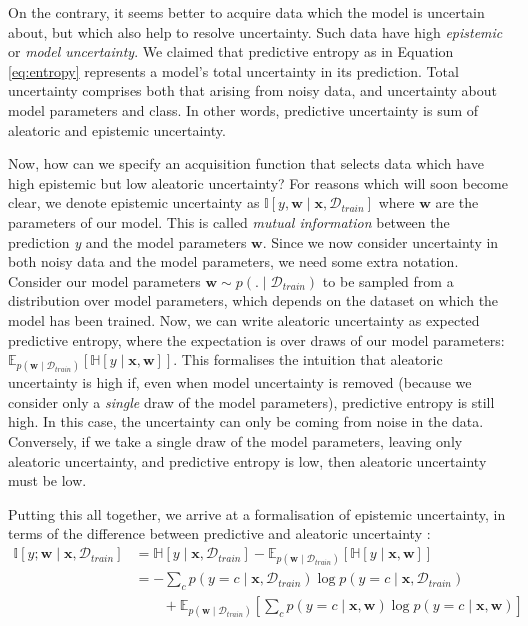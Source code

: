 \documentclass[11pt, a4paper, bibliography=totoc]{report}
\newcommand{\E}[2]{\mathbb{E}_{#1} \left[ #2 \right] }
\newcommand{\data}{\mathcal{D}}
\newcommand{\entropy}[1]{\mathbb{H} \left[ #1 \right] }
\newcommand{\MI}[1]{\mathbb{I} \left[ #1 \right] }
\newcommand{\w}{\mathbf{w}}
\newcommand{\x}{\mathbf{x}}
\begin{document}
On the contrary, it seems better to acquire data which the model is uncertain about, but which also help to resolve uncertainty. Such data have high \textit{epistemic} or \textit{model uncertainty}. We claimed that predictive entropy as in Equation \ref{eq:entropy} represents a model's total uncertainty in its prediction. Total uncertainty comprises both that arising from noisy data, and uncertainty about model parameters and class. In other words, predictive uncertainty is sum of aleatoric and epistemic uncertainty.

Now, how can we specify an acquisition function that selects data which have high epistemic but low aleatoric uncertainty? For reasons which will soon become clear, we denote epistemic uncertainty as $ \MI{y, \w \mid \x, \data_{train}} $ where $ \w $ are the parameters of our model. This is called \textit{mutual information} between the prediction \textit{y} and the model parameters $ \w $. Since we now consider uncertainty in both noisy data and the model parameters, we need some extra notation. Consider our model parameters $ \w \sim p(.\mid \data_{train}) $ to be sampled from a distribution over model parameters, which depends on the dataset on which the model has been trained. Now, we can write aleatoric uncertainty as expected predictive entropy, where the expectation is over draws of our model parameters: $ \E{p(\w \mid \data_{train})}{ \entropy{y \mid \x, \w }} $. This formalises the intuition that aleatoric uncertainty is high if, even when model uncertainty is removed (because we consider only a \textit{single} draw of the model parameters), predictive entropy is still high. In this case, the uncertainty can only be coming from noise in the data. Conversely, if we take a single draw of the model parameters, leaving only aleatoric uncertainty, and predictive entropy is low, then aleatoric uncertainty must be low. %

Putting this all together, we arrive at a formalisation of epistemic uncertainty, in terms of the difference between predictive and aleatoric uncertainty \cite[p.~53]{Gal2017a}:
\begin{align}\label{eq:bald}
\MI{y ; \w \mid \x, \data_{train}} &= \entropy{y \mid \x, \data_{train}} - \E{p(\w \mid \data_{train})}{ \entropy{y \mid \x, \w }} \nonumber \\
&= -\sum_{c} p(y=c \mid \x, \data_{train} ) \log p(y=c \mid \x, \data_{train} ) \nonumber \\ 
&\qquad + \E{p(\w \mid \data_{train})}{\sum_{c} p(y=c \mid \x, \w ) \log p(y=c \mid \x, \w )}
\end{align}
\end{document}
